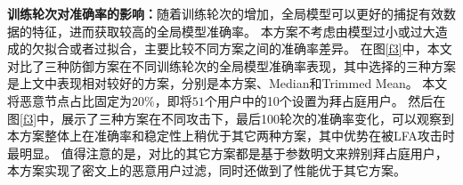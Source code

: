 \textbf{训练轮次对准确率的影响：}随着训练轮次的增加，全局模型可以更好的捕捉有效数据的特征，进而获取较高的全局模型准确率。
本方案不考虑由模型过小或过大造成的欠拟合或者过拟合，主要比较不同方案之间的准确率差异。
在图\ref{f3}中，本文对比了三种防御方案在不同训练轮次的全局模型准确率表现，其中选择的三种方案是上文中表现相对较好的方案，分别是本方案、Median和Trimmed Mean。
本文将恶意节点占比固定为$20\%$，即将$51$个用户中的10个设置为拜占庭用户。
然后在图\ref{f3}中，展示了三种方案在不同攻击下，最后100轮次的准确率变化，可以观察到本方案整体上在准确率和稳定性上稍优于其它两种方案，其中优势在被LFA攻击时最明显。
值得注意的是，对比的其它方案都是基于参数明文来辨别拜占庭用户，本方案实现了密文上的恶意用户过滤，同时还做到了性能优于其它方案。

\begin{figure}[htb]
	\centering


\end{figure}
